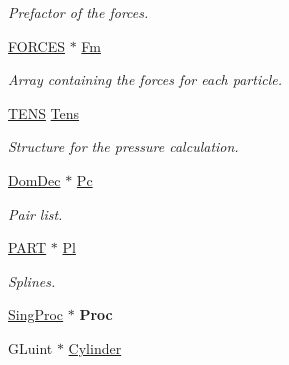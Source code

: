\begin{DoxyCompactItemize}
\begin{DoxyCompactList}\small\item\em \-Prefactor of the forces. \end{DoxyCompactList}\item 
\hypertarget{classForces_afca243db3841bf482910199bdb22e5f3}{\hyperlink{structFORCES}{\-F\-O\-R\-C\-E\-S} $\ast$ \hyperlink{classForces_afca243db3841bf482910199bdb22e5f3}{\-Fm}}\label{classForces_afca243db3841bf482910199bdb22e5f3}

\begin{DoxyCompactList}\small\item\em \-Array containing the forces for each particle. \end{DoxyCompactList}\item 
\hypertarget{classForces_a77e000512807ae8da791d650d739299a}{\hyperlink{structTENS}{\-T\-E\-N\-S} \hyperlink{classForces_a77e000512807ae8da791d650d739299a}{\-Tens}}\label{classForces_a77e000512807ae8da791d650d739299a}

\begin{DoxyCompactList}\small\item\em \-Structure for the pressure calculation. \end{DoxyCompactList}\item 
\hypertarget{classForces_a5d8052dd63b08f01b581aeffa8506051}{\hyperlink{classDdLinkedList}{\-Dom\-Dec} $\ast$ \hyperlink{classForces_a5d8052dd63b08f01b581aeffa8506051}{\-Pc}}\label{classForces_a5d8052dd63b08f01b581aeffa8506051}

\begin{DoxyCompactList}\small\item\em \-Pair list. \end{DoxyCompactList}\item 
\hypertarget{classForces_af6f3b943a0341846e18ac90f4f871b98}{\hyperlink{structPART}{\-P\-A\-R\-T} $\ast$ \hyperlink{classForces_af6f3b943a0341846e18ac90f4f871b98}{\-Pl}}\label{classForces_af6f3b943a0341846e18ac90f4f871b98}

\begin{DoxyCompactList}\small\item\em \-Splines. \end{DoxyCompactList}\item 
\hypertarget{classForces_adde8a4e5814f247c722934064b0f68b9}{\hyperlink{classSingProc}{\-Sing\-Proc} $\ast$ {\bfseries \-Proc}}\label{classForces_adde8a4e5814f247c722934064b0f68b9}

\item 
\hypertarget{classForces_a10385a058195a115177656da1926ee5b}{\-G\-Luint $\ast$ \hyperlink{classForces_a10385a058195a115177656da1926ee5b}{\-Cylinder}}\label{classForces_a10385a058195a115177656da1926ee5b}


\end{DoxyCompactItemize}
